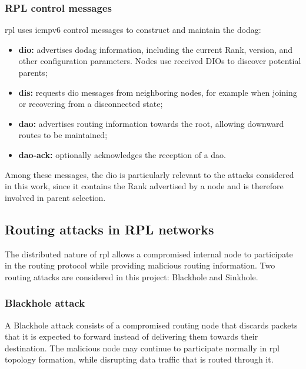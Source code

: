 \subsubsection{RPL control messages}

\gls{rpl} uses \gls{icmpv6} control messages to construct and maintain the \gls{dodag}:

\begin{itemize}
    \item \textbf{\gls{dio}:} advertises \gls{dodag} information, including the current Rank, version, and other configuration parameters. Nodes use received DIOs to discover potential parents;
    
    \item \textbf{\gls{dis}:} requests \gls{dio} messages from neighboring nodes, for example when joining or recovering from a disconnected state;
    
    \item \textbf{\gls{dao}:} advertises routing information towards the root, allowing downward routes to be maintained;
    
    \item \textbf{\gls{dao-ack}:} optionally acknowledges the reception of a \gls{dao}.
\end{itemize}

Among these messages, the \gls{dio} is particularly relevant to the attacks considered in this work, since it contains the Rank advertised by a node and is therefore involved in parent selection.

\subsection{Routing attacks in RPL networks}
\label{subsec:routing_attacks}
The distributed nature of \gls{rpl} allows a compromised internal node to participate in the routing protocol while providing malicious routing information. 
Two routing attacks are considered in this project: Blackhole and Sinkhole.

\subsubsection{Blackhole attack}
A Blackhole attack consists of a compromised routing node that discards packets that it is expected to forward instead of delivering them towards their destination. 
The malicious node may continue to participate normally in \gls{rpl} topology formation, while disrupting data traffic that is routed through it.

